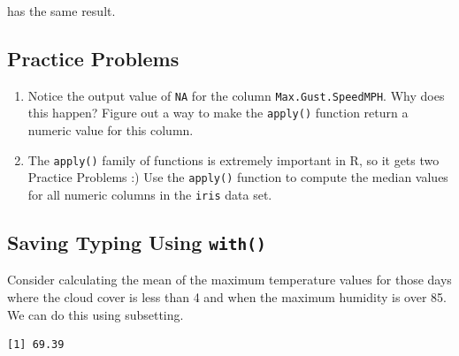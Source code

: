 \documentclass[
]{krantz}
\makeatletter
\newenvironment{Shaded}{\begin{snugshade}}{\end{snugshade}}
\newcommand{\DecValTok}[1]{\textcolor[rgb]{0.06,0.06,0.06}{#1}}
\newcommand{\KeywordTok}[1]{\textcolor[rgb]{0.27,0.27,0.27}{\textbf{#1}}}
\newcommand{\NormalTok}[1]{#1}
\newcommand{\OperatorTok}[1]{\textcolor[rgb]{0.43,0.43,0.43}{\textbf{#1}}}
\newcommand{\StringTok}[1]{\textcolor[rgb]{0.5,0.5,0.5}{#1}}
\providecommand{\tightlist}{%
  \setlength{\itemsep}{0pt}\setlength{\parskip}{0pt}}
\newenvironment{kframe}{%
\medskip{}
\setlength{\fboxsep}{.8em}
 \def\at@end@of@kframe{}%
 \ifinner\ifhmode%
  \def\at@end@of@kframe{\end{minipage}}%
  \begin{minipage}{\columnwidth}%
 \fi\fi%
 \def\FrameCommand##1{\hskip\@totalleftmargin \hskip-\fboxsep
 \colorbox{shadecolor}{##1}\hskip-\fboxsep
     \hskip-\linewidth \hskip-\@totalleftmargin \hskip\columnwidth}%
 \MakeFramed {\advance\hsize-\width
   \@totalleftmargin\z@ \linewidth\hsize
   \@setminipage}}%
 {\par\unskip\endMakeFramed%
 \at@end@of@kframe}
\renewenvironment{Shaded}{\begin{kframe}}{\end{kframe}}
\makeatother
\begin{document}
has the same result.

\hypertarget{practice-problems}{%
\subsection{Practice Problems}\label{practice-problems}}

\begin{enumerate}
\def\labelenumi{\alph{enumi}.}
\tightlist
\item
  Notice the output value of \texttt{NA} for the column \texttt{Max.Gust.SpeedMPH}. Why does this happen? Figure out a way to make the \texttt{apply()} function return a numeric value for this column.
\item
  The \texttt{apply()} family of functions is extremely important in R, so it gets two Practice Problems :) Use the \texttt{apply()} function to compute the median values for all numeric columns in the \texttt{iris} data set.
\end{enumerate}

\hypertarget{saving-typing-using-with}{%
\subsection{\texorpdfstring{Saving Typing Using \texttt{with()}}{Saving Typing Using with()}}\label{saving-typing-using-with}}

Consider calculating the mean of the maximum temperature values for those days where the cloud cover is less than 4 and when the maximum humidity is over 85. We can do this using subsetting.

\begin{Shaded}
\end{Shaded}

\begin{verbatim}
[1] 69.39
\end{verbatim}
\end{document}
